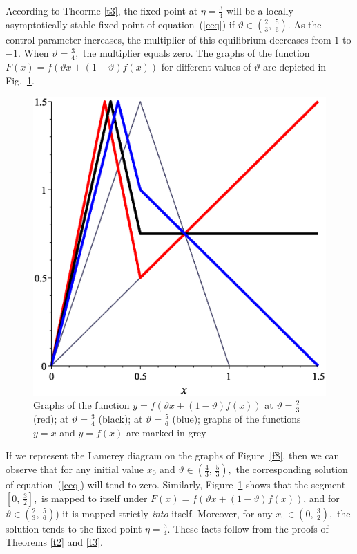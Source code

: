 \documentclass[12pt,a4paper]{amsart}
\begin{document}
According to Theorme \ref{t3}, the fixed point at  $\eta=\frac34$ will be a locally asymptotically stable fixed point of equation~(\ref{ceq}) if
$\vartheta \in \left(\frac23,\,\frac56\right).$ As the control parameter increases, the multiplier of this equilibrium 
decreases from $1$ to $-1.$ When $\vartheta=\frac34,$ the multiplier equals zero. The graphs of the function 
$F(x) = f \left( \vartheta x + (1 - \vartheta)f(x) \right)$ for different values of $\vartheta$ are depicted in Fig.~\ref{f9}. 

\begin{figure}[h!]
\centering
\includegraphics[scale=0.28]{Fig9}
\caption{Graphs of the function $y = f \left( \vartheta x + (1 - \vartheta)f(x) \right)$ at $\vartheta=\frac23$ (red);
at $\vartheta=\frac34$ (black); at $\vartheta=\frac56$ (blue); graphs of the functions $y=x$ and $y=f(x)$ 
are marked in grey} \label{f9}
\end{figure}

If we represent the Lamerey diagram  on the graphs of Figure~\ref{f8}, then we can observe that for any initial value $x_0$ 
and $\vartheta \in \left(\frac43,\,\frac53\right),$ the corresponding solution of equation~(\ref{ceq}) will tend to zero. 
Similarly, Figure~\ref{f9} shows that the segment $\left[ 0,\,\frac32\right],$ is mapped to itself under
$F(x) = f \left( \vartheta x + (1 - \vartheta)f(x) \right)$,  and for $\vartheta \in \left(\frac23,\,\frac56\right)$) it is mapped strictly {\it into} itself.
Moreover, for any $x_0 \in \left(0,\,\frac32\right),$ the solution tends to the fixed point $\eta = \frac34.$ These facts follow from the proofs of Theorems \ref{t2} and \ref{t3}.
\end{document}
